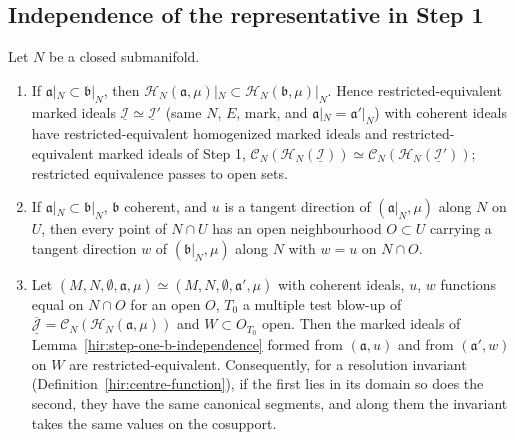 \subsection{Independence of the representative in Step 1}

\begin{theorem}
\label{mc:contact-representative}
\leanok
Let \(N\) be a closed submanifold.
\begin{enumerate}
\item If \(\mathfrak a|_N\subset\mathfrak b|_N\), then \(\mathcal H_N(\mathfrak a,\mu)|_N\subset\mathcal H_N(\mathfrak b,\mu)|_N\). Hence restricted-equivalent marked ideals
\(\underline{\mathcal I}\simeq\underline{\mathcal I}'\) (same \(N\), \(E\), mark, and \(\mathfrak a|_N=\mathfrak a'|_N\)) with coherent ideals have restricted-equivalent homogenized
marked ideals and restricted-equivalent marked ideals of Step 1, \(\mathcal C_N(\mathcal H_N(\underline{\mathcal I}))\simeq\mathcal C_N(\mathcal H_N(\underline{\mathcal I}'))\);
restricted equivalence passes to open sets.
\item If \(\mathfrak a|_N\subset\mathfrak b|_N\), \(\mathfrak b\) coherent, and \(u\) is a tangent direction of \((\mathfrak a|_N,\mu)\) along \(N\) on \(U\), then every point of
\(N\cap U\) has an open neighbourhood \(O\subset U\) carrying a tangent direction \(w\) of \((\mathfrak b|_N,\mu)\) along \(N\) with \(w=u\) on \(N\cap O\).
\item Let \((M,N,\emptyset,\mathfrak a,\mu)\simeq(M,N,\emptyset,\mathfrak a',\mu)\) with coherent ideals, \(u\), \(w\) functions equal on \(N\cap O\) for an open \(O\), \(T_0\) a
multiple test blow-up of \(\overline{\underline{\mathcal J}}=\mathcal C_N(\mathcal H_N(\mathfrak a,\mu))\) and \(W\subset O_{T_0}\) open. Then the marked ideals of
Lemma~\ref{hir:step-one-b-independence} formed from \((\mathfrak a,u)\) and from \((\mathfrak a',w)\) on \(W\) are restricted-equivalent. Consequently, for a resolution
invariant (Definition~\ref{hir:centre-function}), if the first lies in its domain so does the second, they have the same canonical segments, and along them the
invariant takes the same values on the cosupport.
\end{enumerate}
\end{theorem}
